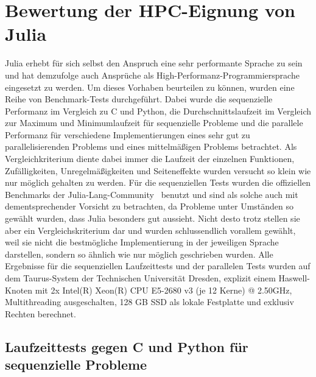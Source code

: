\documentclass[proseminar,german,utf8]{zihpub}
\begin{document}
\section{Bewertung der HPC-Eignung von Julia}
Julia erhebt für sich selbst den Anspruch eine sehr performante Sprache zu sein und hat demzufolge auch Ansprüche als High-Performanz-Programmiersprache eingesetzt zu werden. Um dieses Vorhaben beurteilen zu können, wurden eine Reihe von Benchmark-Tests durchgeführt. Dabei wurde die sequenzielle Performanz im Vergleich zu C und Python, die Durchschnittslaufzeit im Vergleich zur Maximum und Minimumlaufzeit für sequenzielle Probleme und die parallele Performanz für verschiedene Implementierungen eines sehr gut zu parallelisierenden Problems und eines mittelmäßigen Problems betrachtet. Als Vergleichkriterium diente dabei immer die Laufzeit der einzelnen Funktionen, Zufälligkeiten, Unregelmäßigkeiten und Seiteneffekte wurden versucht so klein wie nur möglich gehalten zu werden. Für die sequenziellen Tests wurden die offiziellen Benchmarks der Julia-Lang-Community~\cite{JuliaMicroBenchmarks} benutzt und sind als solche auch mit dementsprechender Vorsicht zu betrachten, da Probleme unter Umständen so gewählt wurden, dass Julia besonders gut aussieht. Nicht desto trotz stellen sie aber ein Vergleichskriterium dar und wurden schlussendlich vorallem gewählt, weil sie nicht die bestmögliche Implementierung in der jeweiligen Sprache darstellen, sondern so ähnlich wie nur möglich geschrieben wurden. Alle Ergebnisse für die sequenziellen Laufzeittests und der parallelen Tests wurden auf dem Taurus-System der Technischen Universität Dresden, explizit einem Haswell-Knoten mit 2x Intel(R) Xeon(R) CPU E5-2680 v3 (je 12 Kerne) @ 2.50GHz, Multithreading ausgeschalten, 128 GB SSD als lokale Festplatte und exklusiv Rechten berechnet. 

\subsection{Laufzeittests gegen C und Python für sequenzielle Probleme}
\end{document}
